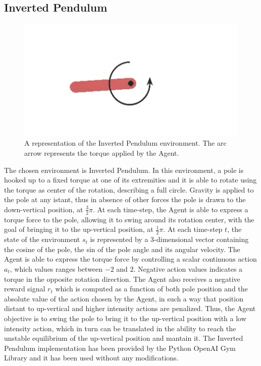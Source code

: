         \subsection{Inverted Pendulum}
            \begin{figure}[!b]
                        \centering
                        \includegraphics[width=13cm, keepaspectratio]{images/results/pendulum.png}
                        \caption{A representation of the Inverted Pendulum environment. The arc arrow represents the torque applied by the Agent.}
                        \label{fig:results_pendulum}
            \end{figure}
            The chosen environment is Inverted Pendulum. In this environment, a pole is hooked up to a fixed torque at one of its extremities and it is able to rotate using the torque as center of the rotation, describing a full circle. Gravity is applied to the pole at any istant, thus in absence of other forces the pole is drawn to the down-vertical position, at $\frac{3}{2}\pi$. At each time-step, the Agent is able to express a torque force to the pole, allowing it to swing around its rotation center, with the goal of bringing it to the up-vertical position, at $\frac{1}{2}\pi$. \newline
            At each time-step $t$, the state of the environment $s_t$ is represented by a 3-dimensional vector containing the cosine of the pole, the sin of the pole angle and its angular velocity. The Agent is able to express the torque force by controlling a scalar continuous action $a_t$, which values ranges between $-2$ and $2$. Negative action values indicates a torque in the opposite rotation direction. The Agent also receives a negative reward signal $r_t$ which is computed as a function of both pole position and the absolute value of the action chosen by the Agent, in such a way that position distant to up-vertical and higher intensity actions are penalized. Thus, the Agent objective is to swing the pole to bring it to the up-vertical position with a low intensity action, which in turn can be translated in the ability to reach the unstable equilibrium of the up-vertical position and mantain it. The Inverted Pendulum implementation has been provided by the Python OpenAI Gym Library and it has been used without any modifications. \newline
